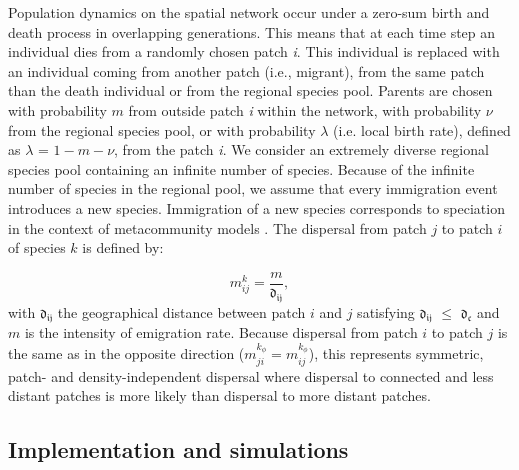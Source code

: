 \documentclass[12pt]{article}
\begin{document}
Population dynamics on the spatial network occur under a zero-sum birth and death process in overlapping generations. This means that at each time step an individual dies from a randomly chosen patch {\em i}. This individual is replaced with an individual coming from another patch (i.e., migrant), from the same patch than the death individual or from the regional species pool. Parents are chosen with probability $m$ from outside patch {\em i} within the network, with probability $\nu$ from the regional species pool, or with probability $\lambda$ (i.e. local birth rate), defined as $\lambda$ = $1 - m - \nu$, from the patch {\em i}. We consider an extremely diverse regional species pool containing an infinite number of species. Because of the infinite number of species in the regional pool, we assume that every immigration event introduces
a new species. Immigration of a new species corresponds to speciation in the context of metacommunity models \citep{Vanpeteghem&Haegeman:2010}. The dispersal from patch $j$ to patch $i$ of species $k$ is defined by:

\begin{equation}
  m_{ij}^{k} =  \frac{m}{\mathfrak{d_{ij}}},
\label{neutdis}
\end{equation}
with $\mathfrak{d_{ij}}$ the geographical distance between patch $i$ and $j$ satisfying $\mathfrak{d_{ij}}$ $\leq$ $\mathfrak{d_{c}}$ and $m$ is the intensity of emigration rate. Because dispersal from patch $i$ to patch $j$ is the same as in the opposite direction ($m_{ji}^{k_{\phi}} = m_{ij}^{k_{\phi}}$), this represents symmetric, patch- and density-independent dispersal where dispersal to connected and less distant patches is more likely than dispersal to more
distant patches.

\subsection*{Implementation and simulations}
\end{document}
